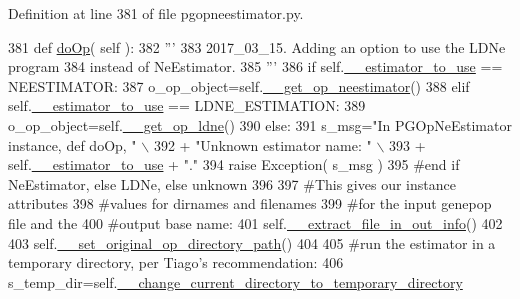Definition at line 381 of file pgopneestimator.\+py.


\begin{DoxyCode}
381     \textcolor{keyword}{def }\hyperlink{classnegui_1_1pgopneestimator_1_1PGOpNeEstimator_a08032c5f1aec98e9da5b258287e67bcc}{doOp}( self ): 
382         \textcolor{stringliteral}{'''}
383 \textcolor{stringliteral}{        2017\_03\_15.  Adding an option to use the LDNe program}
384 \textcolor{stringliteral}{        instead of NeEstimator.}
385 \textcolor{stringliteral}{        '''}
386         \textcolor{keywordflow}{if} self.\hyperlink{classnegui_1_1pgopneestimator_1_1PGOpNeEstimator_a77a1d96335902820fda22a07c902045e}{\_\_estimator\_to\_use} == NEESTIMATOR:
387             o\_op\_object=self.\hyperlink{classnegui_1_1pgopneestimator_1_1PGOpNeEstimator_a8cc2ed983113c0da42ded5cadb65666e}{\_\_get\_op\_neestimator}()
388         \textcolor{keywordflow}{elif} self.\hyperlink{classnegui_1_1pgopneestimator_1_1PGOpNeEstimator_a77a1d96335902820fda22a07c902045e}{\_\_estimator\_to\_use} == LDNE\_ESTIMATION:
389             o\_op\_object=self.\hyperlink{classnegui_1_1pgopneestimator_1_1PGOpNeEstimator_aa91c28f7accf7f30bad7b9e088b11cc6}{\_\_get\_op\_ldne}()
390         \textcolor{keywordflow}{else}:
391             s\_msg=\textcolor{stringliteral}{"In PGOpNeEstimator instance, def doOp, "} \(\backslash\)
392                         + \textcolor{stringliteral}{"Unknown estimator name: "} \(\backslash\)
393                         + self.\hyperlink{classnegui_1_1pgopneestimator_1_1PGOpNeEstimator_a77a1d96335902820fda22a07c902045e}{\_\_estimator\_to\_use} + \textcolor{stringliteral}{"."}
394             \textcolor{keywordflow}{raise} Exception( s\_msg )
395         \textcolor{comment}{#end if NeEstimator, else LDNe, else unknown}
396 
397         \textcolor{comment}{#This gives our instance attributes}
398         \textcolor{comment}{#values for dirnames and filenames}
399         \textcolor{comment}{#for the input genepop file and the}
400         \textcolor{comment}{#output base name:}
401         self.\hyperlink{classnegui_1_1pgopneestimator_1_1PGOpNeEstimator_a20394c87d9eb505576da113bb7a60d86}{\_\_extract\_file\_in\_out\_info}()
402     
403         self.\hyperlink{classnegui_1_1pgopneestimator_1_1PGOpNeEstimator_a09141dc4c7966b39562e64b81eaa1067}{\_\_set\_original\_op\_directory\_path}()
404 
405         \textcolor{comment}{#run the estimator in a temporary directory, per Tiago's recommendation:}
406         s\_temp\_dir=self.\hyperlink{classnegui_1_1pgopneestimator_1_1PGOpNeEstimator_a542f0fb6df8e19293ed2e2e75305a807}{\_\_change\_current\_directory\_to\_temporary\_directory}

\end{DoxyCode}
